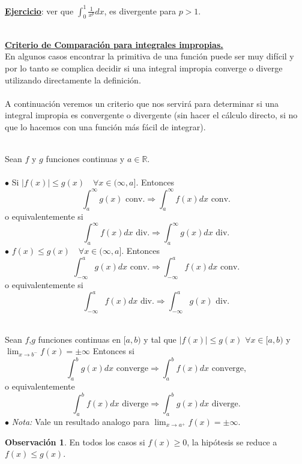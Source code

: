 \documentclass{article}
\theoremstyle{definition}
\theoremstyle{definition}
\newtheorem*{obs}{Observación}
\theoremstyle{remark}
\newcommand\R{\ensuremath{\mathbb{R}}}
\newcommand\infi{\infty}
\begin{document}
\underline{\textbf{Ejercicio}}: ver que $\int_0^1\frac{1}{x^p}dx$, es divergente para $p>1$.\\\\

\pagebreak 

\underline{\textbf{Criterio de Comparación para integrales impropias.}} \\
En algunos casos encontrar la primitiva de una función puede ser muy difícil y por lo tanto se complica decidir si una integral impropia converge o diverge utilizando directamente la definición.
\\\\
 A continuación veremos un criterio que nos servirá para determinar si una integral impropia es convergente o divergente (sin hacer el cálculo directo, si no que lo hacemos con una función más fácil de integrar).
\begin{teo}  \; \\
  Sean $f$ y $g$ funciones continuas y $a \in \R$. \\\\

  $\bullet$ Si $|f(x)| \leq g(x) \quad \forall x \in (\infi,a]$. Entonces $$\int_{a}^{\infi}g(x) \text{ conv.}  \Longrightarrow \int_{a}^{\infi}f(x)dx \text{ conv}.$$
  o equivalentemente si $$
\int_{a}^{\infi}{f(x)dx} \text{ div.} \Longrightarrow \int_{a}^{\infi}{g(x)dx} \text{ div.}
  $$
$\bullet$ $f(x) \leq g(x) \quad \forall x \in (\infi,a]$. Entonces $$
\int_{-\infi}^{a}g(x)dx \text{ conv.} \Longrightarrow \int_{-\infi}^{a}{f(x)dx} \text{ conv.} $$
o equivalentemente si \[
\int_{-\infi}^{a}{f(x)dx} \text{ div.} \Longrightarrow \int_{-\infi}^{a}{g(x)} \text{ div.}
\]
\end{teo}
\pagebreak
\begin{teo} \; \\
  Sean $f$,$g$ funciones continuas en $[a,b)$ y tal que
  $ |f(x)| \leq g(x)$ \quad $ \forall x \in [a,b) $ y
  $\lim_{x \to b^-}f(x) = \pm \infi $ Entonces si
  \[
  \int_a^bg(x)dx \text{ converge} \Longrightarrow \int_a^b f(x)dx \text{ converge,}
  \]
  o equivalentemente
  \[
\int_a^bf(x)dx \text{ diverge} \Longrightarrow \int_a^b g(x)dx \text{ diverge.}
  \]
$\bullet$ \emph{Nota:} Vale un resultado analogo para $\lim_{x \to a^+}{f(x)}=\pm \infi$.
\end{teo}
\begin{obs}
  En todos los casos si $f(x) \geq 0$, la hipótesis se reduce a $f(x) \leq g(x)$.
\end{obs}
\end{document}
